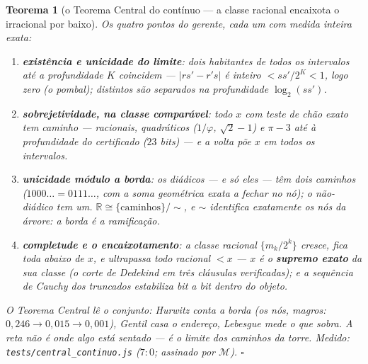 \documentclass[11pt,a4paper]{article}
\newtheorem{teorema}{Teorema}
\newcommand{\code}[1]{\texttt{\small #1}}
\begin{document}
\begin{teorema}[o Teorema Central do contínuo --- a classe racional
encaixota o irracional por baixo]\label{thm:central-continuo}
Os quatro pontos do gerente, cada um com medida inteira exata:
\begin{enumerate}
\item \textbf{existência e unicidade do limite}: dois habitantes de
todos os intervalos até a profundidade $K$ coincidem ---
$|rs'-r's|$ é inteiro $<ss'/2^{K}<1$, logo \emph{zero} (o pombal);
distintos são separados na profundidade $\log_{2}(ss')$.
\item \textbf{sobrejetividade, na classe comparável}: todo $x$ com
teste de chão exato tem caminho --- racionais, quadráticos ($1/\varphi$,
$\sqrt2-1$) e $\pi-3$ até à profundidade do certificado ($23$ bits) ---
e a \emph{volta} põe $x$ em todos os intervalos.
\item \textbf{unicidade módulo a borda}: os diádicos --- e só eles ---
têm \emph{dois} caminhos ($1000\ldots=0111\ldots$, com a soma
geométrica exata a fechar no nó); o não-diádico tem um.
$\mathbb{R}\cong\{\text{caminhos}\}/\!\sim$, e $\sim$ identifica
exatamente \emph{os nós da árvore}: a borda é a ramificação.
\item \textbf{completude e o encaixotamento}: a classe racional
$\{m_{k}/2^{k}\}$ \emph{cresce}, fica \emph{toda abaixo} de $x$, e
\emph{ultrapassa todo racional} $<x$ --- $x$ é o \textbf{supremo
exato} da sua classe (o corte de Dedekind em três cláusulas
verificadas); e a sequência de Cauchy dos truncados estabiliza bit a
bit \emph{dentro} do objeto.
\end{enumerate}
O Teorema Central lê o conjunto: Hurwitz \emph{conta} a borda (os
nós, magros: $0{,}246\to0{,}015\to0{,}001$), Gentil \emph{casa} o
endereço, Lebesgue \emph{mede} o que sobra. \emph{A reta não é onde
algo está sentado --- é o limite dos caminhos da torre.}
\emph{Medido:} \code{tests/central\_continuo.js} ($7{:}0$; assinado
por $\mathcal{M}$).
$\square$
\end{teorema}
\end{document}
